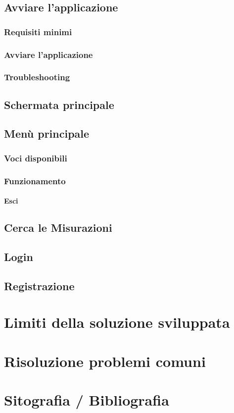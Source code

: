 \documentclass[a4paper, 12pt]{report}
\begin{document}
	\newpage

	\section{Avviare l'applicazione}

		\subsection{Requisiti minimi}

		\subsection{Avviare l'applicazione}

		\subsection{Troubleshooting}

	\section{Schermata principale}

	\section{Menù principale}
	\subsection{Voci disponibili}
	\subsection{Funzionamento}
			\subsubsection{Esci}

	\section{Cerca le Misurazioni}
	\section{Login}
	\section{Registrazione}

	\chapter{Limiti della soluzione sviluppata}
	\chapter{Risoluzione problemi comuni}
	\chapter{Sitografia / Bibliografia}

	
\end{document}

